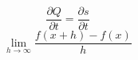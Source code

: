 \begin{equation}
    \frac{\partial Q}{\partial t} = \frac{\partial s}{\partial t}
\end{equation}
%
\begin{equation}
    \lim\limits_{h \rightarrow \infty}{\frac{f(x+h) - f(x)}{h}}
\end{equation}

